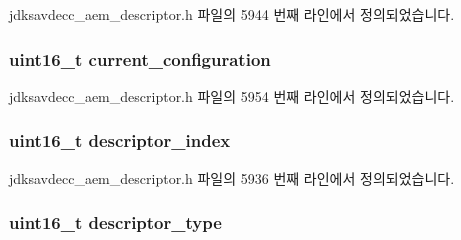 jdksavdecc\+\_\+aem\+\_\+descriptor.\+h 파일의 5944 번째 라인에서 정의되었습니다.

\subsubsection[{\texorpdfstring{current\+\_\+configuration}{current_configuration}}]{\setlength{\rightskip}{0pt plus 5cm}uint16\+\_\+t current\+\_\+configuration}\hypertarget{structjdksavdecc__descriptor__entity_acbe7b9cc1c5e0e0f5f18fd0552641649}{}\label{structjdksavdecc__descriptor__entity_acbe7b9cc1c5e0e0f5f18fd0552641649}


jdksavdecc\+\_\+aem\+\_\+descriptor.\+h 파일의 5954 번째 라인에서 정의되었습니다.

\subsubsection[{\texorpdfstring{descriptor\+\_\+index}{descriptor_index}}]{\setlength{\rightskip}{0pt plus 5cm}uint16\+\_\+t descriptor\+\_\+index}\hypertarget{structjdksavdecc__descriptor__entity_a042bbc76d835b82d27c1932431ee38d4}{}\label{structjdksavdecc__descriptor__entity_a042bbc76d835b82d27c1932431ee38d4}


jdksavdecc\+\_\+aem\+\_\+descriptor.\+h 파일의 5936 번째 라인에서 정의되었습니다.

\subsubsection[{\texorpdfstring{descriptor\+\_\+type}{descriptor_type}}]{\setlength{\rightskip}{0pt plus 5cm}uint16\+\_\+t descriptor\+\_\+type}\hypertarget{structjdksavdecc__descriptor__entity_ab7c32b6c7131c13d4ea3b7ee2f09b78d}{}\label{structjdksavdecc__descriptor__entity_ab7c32b6c7131c13d4ea3b7ee2f09b78d}


